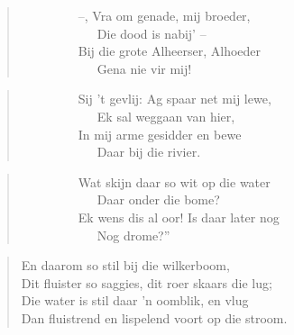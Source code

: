 \begin{verse}
\ \ \ \ \ \ \ \ \ --, Vra om genade, mij broeder, \\ 
\ \ \ \ \ \ \ \ \ \ \ \ Die dood is nabij’ --  \\ 
\ \ \ \ \ \ \ \ \ Bij die grote Alheerser, Alhoeder \\ 
\ \ \ \ \ \ \ \ \ \ \ \ Gena nie vir mij! \\ 
\end{verse}

\begin{verse}
\ \ \ \ \ \ \ \ \ Sij ’t gevlij: Ag spaar net mij lewe, \\ 
\ \ \ \ \ \ \ \ \ \ \ \ Ek sal weggaan van hier, \\ 
\ \ \ \ \ \ \ \ \ In mij arme gesidder en bewe \\ 
\ \ \ \ \ \ \ \ \ \ \ \ Daar bij die rivier. \\ 
\end{verse}

\begin{verse}
\ \ \ \ \ \ \ \ \ Wat skijn daar so wit op die water \\ 
\ \ \ \ \ \ \ \ \ \ \ \ Daar onder die bome? \\ 
\ \ \ \ \ \ \ \ \ Ek wens dis al oor! Is daar later nog \\ 
\ \ \ \ \ \ \ \ \ \ \ \ Nog drome?'' \\ 
\end{verse}

\begin{verse}
En daarom so stil bij die wilkerboom, \\ 
Dit fluister so saggies, dit roer skaars die lug; \\ 
Die water is stil daar ’n oomblik, en vlug \\ 
Dan fluistrend en lispelend voort op die stroom. \\ 
\end{verse}
